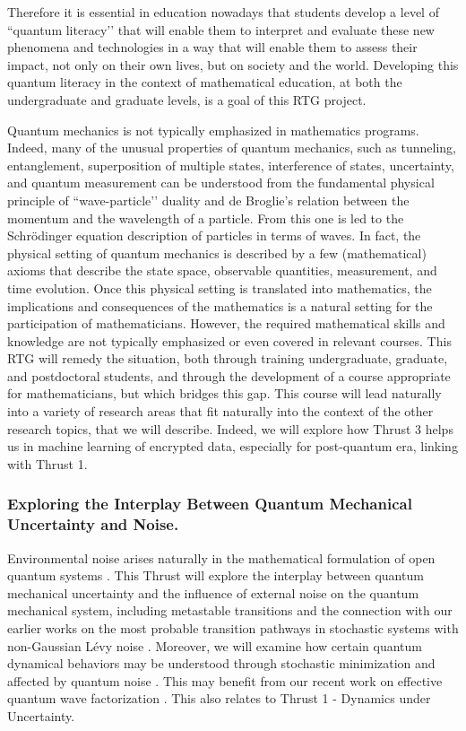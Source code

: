 \documentclass[11pt]{NSFamsart}
\begin{document}
Therefore it is essential in education nowadays that students develop a level of ``quantum literacy’’ \cite{foti2021quantum} that will enable them to interpret and evaluate these new phenomena and technologies in a way that will enable them to assess their impact, not only on their own  lives, but on society and the world. Developing this quantum literacy in the context of mathematical education,    at both the undergraduate and graduate   levels,  is a goal of this RTG project.


Quantum mechanics is not typically emphasized in mathematics programs.  Indeed, many of the unusual properties of quantum mechanics, such as tunneling, entanglement, superposition of multiple states, interference of states, uncertainty, and quantum measurement can be understood from the fundamental physical principle of ``wave-particle’’ duality and de Broglie’s relation between the momentum and the wavelength of a particle.  From this one is led to the Schr\"{o}dinger equation description of particles in terms of waves. In fact, the physical setting of quantum mechanics is described by a few (mathematical) axioms that describe the state space, observable quantities, measurement, and time evolution.  Once this physical setting is translated into mathematics, the implications and consequences of the mathematics is a natural setting for the participation of mathematicians. However, the required mathematical skills and knowledge are not typically emphasized or even covered in relevant courses. This RTG will remedy the situation, both through training undergraduate, graduate, and postdoctoral students, and through the development of a course appropriate for mathematicians, but which bridges this gap. This course will lead naturally into a variety of research areas that fit naturally into the context of the other research topics, that we will describe. Indeed, we will explore how   Thrust 3 helps us in machine learning of encrypted data, especially for post-quantum era, linking with Thrust 1.  

\subsubsection*{Exploring the Interplay Between Quantum Mechanical Uncertainty and Noise.}  Environmental noise   arises naturally in the mathematical formulation of open quantum systems \cite{Lidar2019LectureNO, Breuer2002TheTO,Macieszczak2021TheoryOC, Griffiths2018IntroductionTQ}. This Thrust will explore the interplay between quantum mechanical uncertainty and the influence of external noise \cite{Lindgren2019QuantumMC, Nagasawa2000StochasticPI} on the quantum mechanical system, including metastable transitions \cite{Macieszczak2021TheoryOC, Rose2019MetastabilityRA} and the connection with our earlier works on the most probable transition pathways in stochastic systems with non-Gaussian L\'evy noise \cite{ChaoDuanOM}. Moreover, we will examine how certain quantum dynamical behaviors  may be understood through stochastic minimization \cite{Lindgren2019QuantumMC} and affected by quantum noise \cite{Nurdin2019QuantumSP}. This may   benefit from our recent work on effective quantum wave factorization \cite{ZHANG2020132573}. This also relates to   Thrust 1 - Dynamics under Uncertainty.
\end{document}
